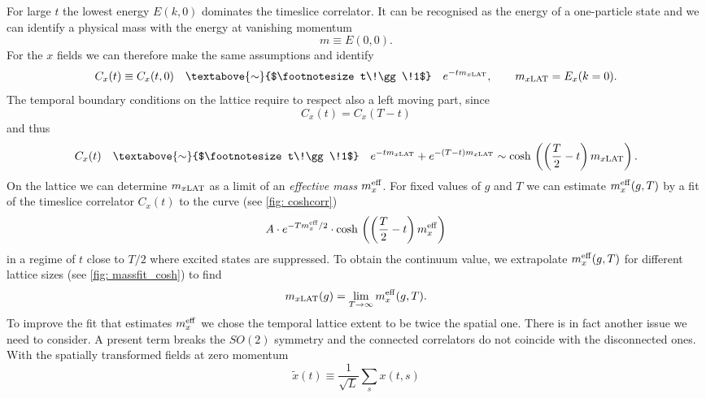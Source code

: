 %
%
For large $t$ the lowest energy $E(k,0)$ dominates the timeslice correlator. It can be recognised as the energy of a one-particle state and we can identify a physical mass with the energy at vanishing momentum
%
%
\begin{equation}
m \equiv E(0,0).
\end{equation}
%
%
For the $x$ fields we can therefore make the same assumptions and identify
%
%
\begin{equation}
C_{x}(t) \equiv C_{x}(t,0) \quad \textabove{\sim}{$\footnotesize t\!\gg\!1$} \quad e^{-tm_{x \rm LAT}}, \qquad m_{x\rm LAT} = E_{x}(k=0).
\end{equation}
%
%
The temporal boundary conditions on the lattice require to respect also a left moving part, since
%
%
\begin{equation}
C_{x}(t) = C_{x}(T-t)
\end{equation}
%
%
and thus
%
%
\begin{equation}
C_{x}(t) \quad \textabove{\sim}{$\footnotesize t\!\gg\!1$} \quad e^{-tm_{x \rm LAT}}+e^{-(T-t)m_{x \rm LAT}} \sim \text{cosh\,}\left(\left(\frac{T}{2}-t\right) m_{x\rm LAT}\right).
\end{equation}
%
%
%
%
On the lattice we can determine $m_{x\rm LAT}$ as a limit of an \textit{effective mass} $m_{x}^{\rm eff}$. For fixed values of $g$ and $T$ we can estimate $m_{x}^{\rm eff}(g,T)$ by a fit of the timeslice correlator $C_{x}(t)$ to the curve (see \autoref{fig: coshcorr})
%
%
\begin{equation}
A\cdot e^{-Tm_{x}^{\rm eff}/2}\cdot\text{cosh\,}\left(\left(\frac{T}{2}-t\right) m_{x}^{\rm eff}\right)
\label{eq: cosh_fit}
\end{equation}
%
%
in a regime of $t$ close to $T/2$ where excited states are suppressed. To obtain the continuum value, we extrapolate $m_{x}^{\rm eff}(g,T)$ for different lattice sizes (see \autoref{fig: massfit_cosh}) to find
%
%
\begin{equation}
m_{x\rm LAT}(g) = \lim\limits_{T\to \infty} m_{x}^{\rm eff}(g,T).
\end{equation}
To improve the fit that estimates $m_{x}^{\rm eff}$ we chose the temporal lattice extent to be twice the spatial one. There is in fact another issue we need to consider. A present  term breaks the $SO(2)$ symmetry and the connected correlators do not coincide with the disconnected ones. With the spatially  transformed fields at zero momentum
%
%
\begin{equation}
\tilde{x}(t)\equiv\frac{1}{\sqrt{L}} \sum\limits_{s} x(t,s)
\end{equation}
